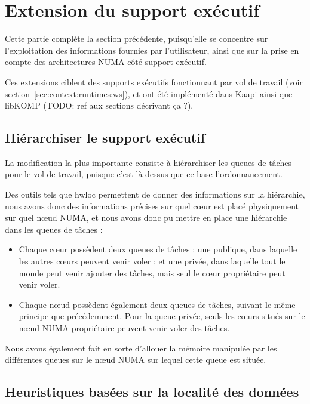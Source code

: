 \section{Extension du support exécutif}\label{sec:openmp:runtime}

Cette partie complète la section précédente, puisqu'elle se concentre sur l'exploitation des informations fournies par l'utilisateur, ainsi que sur la prise en compte des architectures NUMA côté support exécutif.

Ces extensions ciblent des supports exécutifs fonctionnant par vol de travail (voir section~\ref{sec:context:runtimes:ws}), et ont été implémenté dans Kaapi ainsi que libKOMP (TODO: ref aux sections décrivant ça ?).

\subsection{Hiérarchiser le support exécutif}

La modification la plus importante consiste à hiérarchiser les queues de tâches pour le vol de travail, puisque c'est là dessus que ce base l'ordonnancement.

Des outils tels que hwloc permettent de donner des informations sur la hiérarchie, nous avons donc des informations précises sur quel cœur est placé physiquement sur quel nœud NUMA, et nous avons donc pu mettre en place une hiérarchie dans les queues de tâches :

\begin{itemize}
  \item Chaque cœur possèdent deux queues de tâches : une publique, dans laquelle les autres cœurs peuvent venir voler ; et une privée, dans laquelle tout le monde peut venir ajouter des tâches, mais seul le cœur propriétaire peut venir voler.
  \item Chaque nœud possèdent également deux queues de tâches, suivant le même principe que précédemment. Pour la queue privée, seuls les cœurs situés sur le nœud NUMA propriétaire peuvent venir voler des tâches.
\end{itemize}

Nous avons également fait en sorte d'allouer la mémoire manipulée par les différentes queues sur le nœud NUMA sur lequel cette queue est située.



\subsection{Heuristiques basées sur la localité des données}\label{sec:contrib:ws:heuristics}

